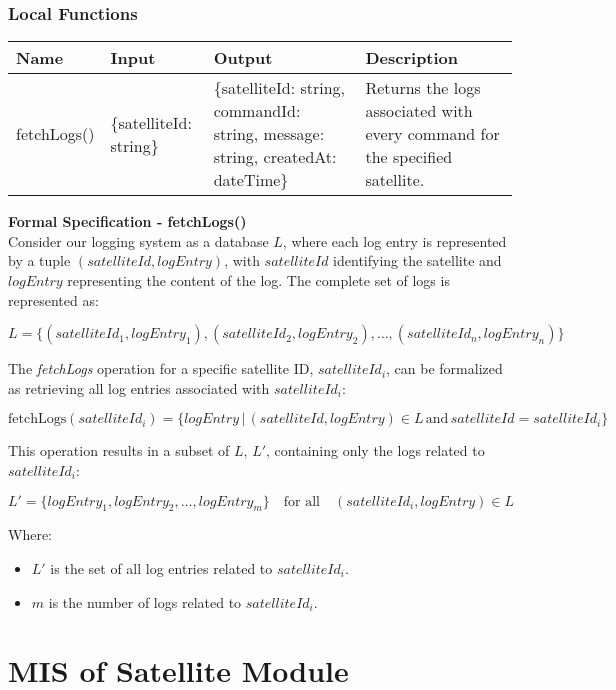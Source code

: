 \documentclass[12pt, titlepage]{article}
\begin{document}
\subsubsection{ Local Functions}
\begin{center}
\begin{tabular}{p{2cm} p{4cm} p{4cm} p{4cm}}
\hline
\textbf{Name} & \textbf{Input} & \textbf{Output} & \textbf{Description} \\
\hline
fetchLogs() & \{satelliteId: string\} & \{satelliteId: string, commandId: string, message: string, createdAt: dateTime\} & Returns the logs associated with every command for the specified satellite. \\
\hline
\end{tabular}
\end{center}

\textbf{Formal Specification - fetchLogs()}\\
Consider our logging system as a database $L$, where each log entry is represented by a tuple $(satelliteId, logEntry)$, with $satelliteId$ identifying the satellite and $logEntry$ representing the content of the log. The complete set of logs is represented as:

\[
L = \{(satelliteId_1, logEntry_1), (satelliteId_2, logEntry_2), \ldots, (satelliteId_n, logEntry_n)\}
\]

The \textit{fetchLogs} operation for a specific satellite ID, $satelliteId_i$, can be formalized as retrieving all log entries associated with $satelliteId_i$:

\[
\text{fetchLogs}(satelliteId_i) = \{logEntry \,|\, (satelliteId, logEntry) \in L \, \text{and} \, satelliteId = satelliteId_i\}
\]

This operation results in a subset of $L$, $L'$, containing only the logs related to $satelliteId_i$:

\[
L' = \{logEntry_1, logEntry_2, \ldots, logEntry_m\} \quad \text{for all} \quad (satelliteId_i, logEntry) \in L
\]

Where:
\begin{itemize}
    \item $L'$ is the set of all log entries related to $satelliteId_i$.
    \item $m$ is the number of logs related to $satelliteId_i$.
\end{itemize}

 
\section{MIS of {Satellite Module}} \label{Module} 
\end{document}

